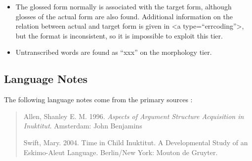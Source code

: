 \documentclass[a4paper, 11pt]{book}
\begin{document}
\begin{itemize}
	\item The glossed form normally is associated with the target form, although glosses of the actual form are also found. Additional information on the relation between actual and target form is given in <a type=“errcoding”>, but the format is inconsistent, so it is impossible to exploit this tier.
	\item Untranscribed words are found as “xxx” on the morphology tier. 
\end{itemize}

\subsection{Language Notes}

The following language notes come from the primary sources \citep{Allen1996a, swift2008time}:

\begin{quote}
Allen, Shanley E. M. 1996. \textit{Aspects of Argument Structure Acquisition in Inuktitut}. Amsterdam: John Benjamins

Swift, Mary. 2004. Time in Child Inuktitut. A Developmental Study of an Eskimo-Aleut Language. Berlin/New York: Mouton de Gruyter.
\end{quote}
\end{document}
